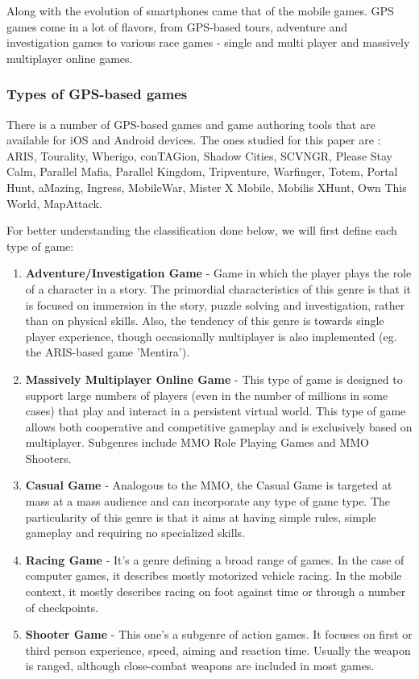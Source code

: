 \documentclass{article}
\begin{document}
Along with the evolution of smartphones came that of the mobile games. GPS games
come in a lot of flavors, from GPS-based tours, adventure and investigation
games to various race games - single and multi player and massively multiplayer
online games.


\subsubsection{Types of GPS-based games }

There is a number of GPS-based games and game authoring tools that are
available for iOS and Android devices. The ones studied for this paper are :
ARIS, Tourality, Wherigo, conTAGion, Shadow Cities, SCVNGR, Please Stay Calm,
Parallel Mafia, Parallel Kingdom, Tripventure, Warfinger, Totem, Portal Hunt,
aMazing, Ingress, MobileWar, Mister X Mobile, Mobilis XHunt, Own This World,
MapAttack.\newline

For better understanding the classification done below, we will first define
each type of game:

\begin{enumerate}
  \item \textbf{Adventure/Investigation Game} - Game in which the player plays
  the role of a character in a story. The primordial characteristics of this
  genre is that it is focused on immersion in the story, puzzle solving and
  investigation, rather than on physical skills. Also, the tendency of this
  genre is towards single player experience, though occasionally multiplayer is
  also implemented (eg. the ARIS-based game 'Mentira').
  
  \item \textbf{Massively Multiplayer Online Game} - This type of game is
  designed to support large numbers of players (even in the number of millions
  in some cases) that play and interact in a persistent virtual world. This type
  of game allows both cooperative and competitive gameplay and is exclusively
  based on multiplayer. Subgenres include MMO Role Playing Games and
  MMO Shooters.
  
  \item \textbf{Casual Game} - Analogous to the MMO, the Casual Game is targeted
  at mass at a mass audience and can incorporate any type of game type. The
  particularity of this genre is that it aims at having simple rules, simple
  gameplay and requiring no specialized skills. 
  
  \item \textbf{Racing Game} - It's a genre defining a broad range of games. In
  the case of computer games, it describes mostly motorized vehicle racing. In
  the mobile context, it mostly describes racing on foot against time or through
  a number of checkpoints.
  
  \item \textbf{Shooter Game} - This one's a subgenre of action games. It
  focuses on first or third person experience, speed, aiming and reaction time.
  Usually the weapon is ranged, although close-combat weapons are included in
  most games.
  
\end{enumerate}
\end{document}
